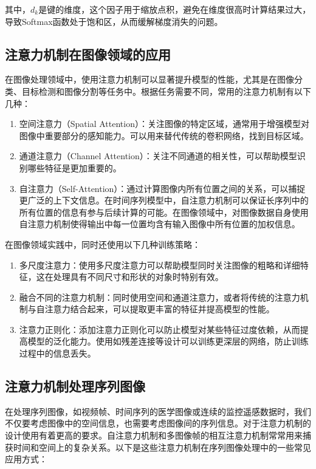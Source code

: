 其中，\(d_k\)是键的维度，这个因子用于缩放点积，避免在维度很高时计算结果过大，导致Softmax函数处于饱和区，从而缓解梯度消失的问题\cite{2023AttentionAllYouNeed}。
\subsection{注意力机制在图像领域的应用}
在图像处理领域中，使用注意力机制可以显著提升模型的性能，尤其是在图像分类、目标检测和图像分割等任务中。根据任务需要不同，常用的注意力机制有以下几种：
\begin{enumerate}    
  \item 空间注意力（Spatial Attention）：关注图像的特定区域，通常用于增强模型对图像中重要部分的感知能力。可以用来替代传统的卷积网络，找到目标区域。
  \item 通道注意力（Channel Attention）：关注不同通道的相关性，可以帮助模型识别哪些特征是更加重要的。
  \item 自注意力（Self-Attention）：通过计算图像内所有位置之间的关系，可以捕捉更广泛的上下文信息。在时间序列模型中，自注意力机制可以保证长序列中的所有位置的信息有参与后续计算的可能。在图像领域中，对图像数据自身使用自注意力机制使得输出中每一位置均含有输入图像中所有位置的加权信息。
\end{enumerate}

在图像领域实践中，同时还使用以下几种训练策略：
\begin{enumerate}    
  \item 多尺度注意力：使用多尺度注意力可以帮助模型同时关注图像的粗略和详细特征，这在处理具有不同尺寸和形状的对象时特别有效。
  \item 融合不同的注意力机制：同时使用空间和通道注意力，或者将传统的注意力机制与自注意力结合起来，可以提取更丰富的特征并提高模型的性能。
  \item 注意力正则化：添加注意力正则化可以防止模型对某些特征过度依赖，从而提高模型的泛化能力。使用如残差连接等设计可以训练更深层的网络，防止训练过程中的信息丢失。
\end{enumerate}

\subsection{注意力机制处理序列图像}
在处理序列图像，如视频帧、时间序列的医学图像或连续的监控遥感数据时，我们不仅要考虑图像中的空间信息，也需要考虑图像间的序列信息。对于注意力机制的设计使用有着更高的要求。自注意力机制和多图像帧的相互注意力机制常常用来捕获时间和空间上的复杂关系。以下是这些注意力机制在序列图像处理中的一些常见应用方式：

